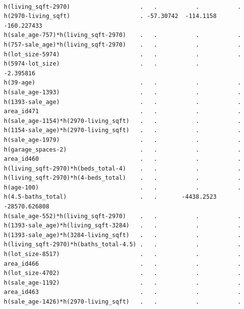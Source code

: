 \documentclass[
]{article}
\begin{document}
\begin{verbatim}
                                                                           
h(living_sqft-2970)                    .   .           .           .       
h(2970-living_sqft)                    . -57.30742  -114.1158   -160.227433
h(sale_age-757)*h(living_sqft-2970)    .   .           .           .       
h(757-sale_age)*h(living_sqft-2970)    .   .           .           .       
h(lot_size-5974)                       .   .           .           .       
h(5974-lot_size)                       .   .           .          -2.395816
h(39-age)                              .   .           .           .       
h(sale_age-1393)                       .   .           .           .       
h(1393-sale_age)                       .   .           .           .       
area_id471                             .   .           .           .       
h(sale_age-1154)*h(2970-living_sqft)   .   .           .           .       
h(1154-sale_age)*h(2970-living_sqft)   .   .           .           .       
h(sale_age-1979)                       .   .           .           .       
h(garage_spaces-2)                     .   .           .           .       
area_id460                             .   .           .           .       
h(living_sqft-2970)*h(beds_total-4)    .   .           .           .       
h(living_sqft-2970)*h(4-beds_total)    .   .           .           .       
h(age-100)                             .   .           .           .       
h(4.5-baths_total)                     .   .       -4438.2523 -28570.626808
h(sale_age-552)*h(living_sqft-2970)    .   .           .           .       
h(1393-sale_age)*h(living_sqft-3284)   .   .           .           .       
h(1393-sale_age)*h(3284-living_sqft)   .   .           .           .       
h(living_sqft-2970)*h(baths_total-4.5) .   .           .           .       
h(lot_size-8517)                       .   .           .           .       
area_id466                             .   .           .           .       
h(lot_size-4702)                       .   .           .           .       
h(sale_age-1192)                       .   .           .           .       
area_id463                             .   .           .           .       
h(sale_age-1426)*h(2970-living_sqft)   .   .           .           .       
                                                                              

\end{verbatim}
\end{document}
